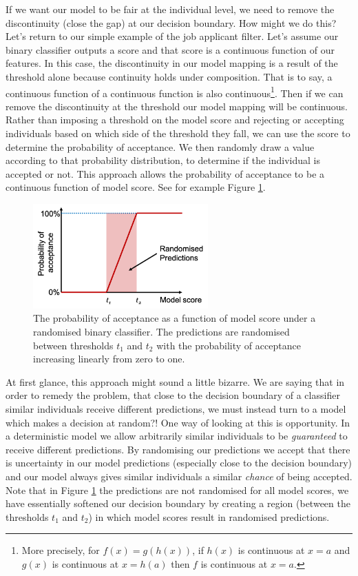 If we want our model to be fair at the individual level, we need to remove the discontinuity (close the gap) at our decision boundary. How might we do this? Let's return to our simple example of the job applicant filter. Let's assume our binary classifier outputs a score and that score is a continuous function of our features. In this case, the discontinuity in our model mapping is a result of the threshold alone because continuity holds under composition. That is to say, a continuous function of a continuous function is also continuous\footnote{More precisely, for $f(x)=g(h(x))$, if $h(x)$ is continuous at $x=a$ and $g(x)$ is continuous at $x=h(a)$ then $f$ is continuous at $x=a$.}. Then if we can remove the discontinuity at the threshold our model mapping will be continuous. Rather than imposing a threshold on the model score and rejecting or accepting individuals based on which side of the threshold they fall, we can use the score to determine the probability of acceptance. We then randomly draw a value according to that probability distribution, to determine if the individual is accepted or not. This approach allows the probability of acceptance to be a continuous function of model score. See for example Figure \ref{fig:ContThreshold}.
%
\begin{figure}[h!]
\centering
\includegraphics[width=0.6\textwidth]{04_IndividualFairness/figures/Fig_Score2ProbCont.png}
\caption[The probability of acceptance as a function of model score under a randomised binary classifier.]{The probability of acceptance as a function of model score under a randomised binary classifier. The predictions are randomised between thresholds $t_1$ and $t_2$ with the probability of acceptance increasing linearly from zero to one.}
\label{fig:ContThreshold}
\end{figure}

At first glance, this approach might sound a little bizarre. We are saying that in order to remedy the problem, that close to the decision boundary of a classifier similar individuals receive different predictions, we must instead turn to a model which makes a decision at random?! One way of looking at this is opportunity. In a deterministic model we allow arbitrarily similar individuals to be \emph{guaranteed} to receive different predictions. By randomising our predictions we accept that there is uncertainty in our model predictions (especially close to the decision boundary) and our model always gives similar individuals a similar \emph{chance} of being accepted. Note that in Figure \ref{fig:ContThreshold} the predictions are not randomised for all model scores, we have essentially softened our decision boundary by creating a region (between the thresholds $t_1$ and $t_2$) in which model scores result in randomised predictions.

